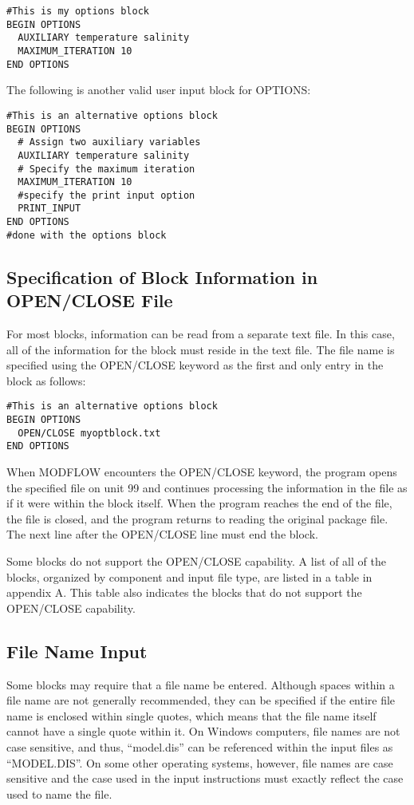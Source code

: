 \begin{lstlisting}[style=inputfile]
#This is my options block
BEGIN OPTIONS
  AUXILIARY temperature salinity
  MAXIMUM_ITERATION 10
END OPTIONS
\end{lstlisting}

\noindent The following is another valid user input block for OPTIONS:

\begin{lstlisting}[style=inputfile]
#This is an alternative options block
BEGIN OPTIONS
  # Assign two auxiliary variables
  AUXILIARY temperature salinity
  # Specify the maximum iteration
  MAXIMUM_ITERATION 10
  #specify the print input option
  PRINT_INPUT
END OPTIONS
#done with the options block
\end{lstlisting}

\subsection{Specification of Block Information in OPEN/CLOSE File} 
For most blocks, information can be read from a separate text file.  In this case, all of the information for the block must reside in the text file.  The file name is specified using the OPEN/CLOSE keyword as the first and only entry in the block as follows:

\begin{lstlisting}[style=inputfile]
#This is an alternative options block
BEGIN OPTIONS
  OPEN/CLOSE myoptblock.txt
END OPTIONS
\end{lstlisting}

\noindent When MODFLOW encounters the OPEN/CLOSE keyword, the program opens the specified file on unit 99 and continues processing the information in the file as if it were within the block itself.  When the program reaches the end of the file, the file is closed, and the program returns to reading the original package file.  The next line after the OPEN/CLOSE line must end the block.

Some blocks do not support the OPEN/CLOSE capability.  A list of all of the blocks, organized by component and input file type, are listed in a table in appendix A.  This table also indicates the blocks that do not support the OPEN/CLOSE capability.

\subsection{File Name Input}
Some blocks may require that a file name be entered.  Although spaces within a file name are not generally recommended, they can be specified if the entire file name is enclosed within single quotes, which means that the file name itself cannot have a single quote within it.  On Windows computers, file names are not case sensitive, and thus, ``model.dis'' can be referenced within the input files as ``MODEL.DIS''.  On some other operating systems, however, file names are case sensitive and the case used in the input instructions must exactly reflect the case used to name the file.

